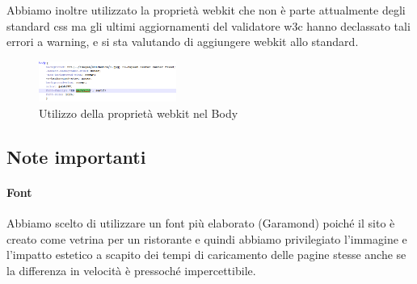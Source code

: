 Abbiamo inoltre utilizzato la proprietà webkit che non è parte attualmente degli standard css ma gli ultimi aggiornamenti del validatore w3c hanno declassato tali errori a warning, e si sta valutando di aggiungere webkit allo standard.

\begin{figure}[H]
		\centering \includegraphics[width=0.4\textwidth]{images/webkit.png}
		\caption{Utilizzo della proprietà webkit nel Body}
\end{figure}

\subsection{Note importanti}

\paragraph{Font}

Abbiamo scelto di utilizzare un font più elaborato (Garamond) poiché il sito è creato come vetrina per un ristorante e quindi abbiamo privilegiato l’immagine e l’impatto estetico a scapito dei tempi di caricamento delle pagine stesse anche se la differenza in velocità è pressoché impercettibile.
